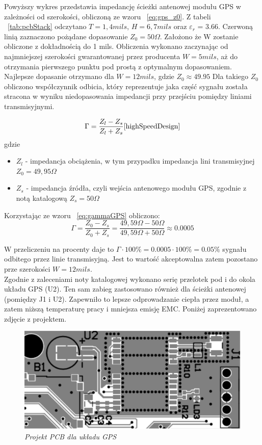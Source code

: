 \documentclass[eng,printmode]{mgr}
\begin{document}
Powyższy wykres przedstawia impedancję ścieżki antenowej modułu GPS w zależności od szerokości, obliczoną ze wzoru ~\ref{eq:gps_z0}. Z tabeli ~\ref{tab:pcbStack} odczytano $T = 1,4 mils$, $H = 6,7 mils$ oraz \textbf{$\varepsilon_r$} = 3.66. Czerwoną linią zaznaczono pożądane dopasowanie $Z_0 = 50 \Omega$. Założono że W zostanie obliczone z dokładnością do 1 mils. Obliczenia wykonano zaczynając od najmniejszej szerokości gwarantowanej przez producenta $W = 5 mils$, aż do otrzymania pierwszego punktu pod prostą z optymalnym dopasowaniem. Najlepsze dopasanie otrzymano dla $W = 12 mils$, gdzie $Z_0 \approx 49.95$
Dla takiego $Z_0$ obliczono współczynnik odbicia, który reprezentuje jaka część sygnału została stracona w wyniku niedopasowania impedancji przy przejściu pomiędzy liniami transmisyjnymi.

\begin{equation}
\Gamma= \frac{Z_l - Z_s}{Z_l + Z_s} \label{eq:gammaGPS} \cite{highSpeedDesign}
\end{equation}
gdzie
\begin{itemize}
  \item $Z_l$ - impedancja obciążenia, w tym przypadku impedancja lini transmisyjnej $Z_0 = 49,95 \Omega$
  \item $Z_s$ - impedancja źródła, czyli wejścia antenowego modułu GPS, zgodnie z notą katalogową $Z_s = 50 \Omega$
\end{itemize}

Korzystając ze wzoru ~\ref{eq:gammaGPS} obliczono:
\begin{equation}
\Gamma= \frac{Z_0 - Z_s}{Z_0 + Z_s} = \frac{49,59\Omega -50\Omega}{49,59\Omega  + 50\Omega } \approx 0.0005 
\end{equation}

W przeliczeniu na procenty daje to $\Gamma \cdot 100\% = 0.0005 \cdot 100\% = 0.05\%$ sygnału odbitego przez linie transmisyjną. Jest to wartość akceptowalna zatem pozostano prze szerokości $W = 12 mils$.\\

Zgodnie z zaleceniami noty katalogowej wykonano serię przelotek pod i do okola układu GPS (U2). Ten sam zabieg zastosowano również dla ścieżki antenowej (pomiędzy J1 i U2). Zapewniło to lepsze odprowadzanie ciepła przez moduł, a zatem niższą temperaturę pracy i mniejsza emisję EMC. Poniżej zaprezentowano zdjęcie z projektem.
\begin{figure}[!h]
    \centering
    \includegraphics[width=15cm]{pcb/gps.png}
    \caption{\textit{Projekt PCB dla układu GPS}}
\end{figure}
\end{document}
